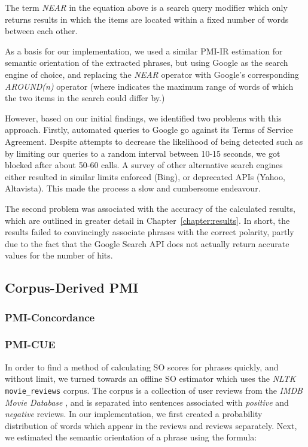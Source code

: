 \documentclass[11pt]{report} %
\begin{document}
The term \textit{NEAR} in the equation above is a search query modifier which only returns results in which the items are located within a fixed number of words between each other. 

As a basis for our implementation, we used a similar PMI-IR estimation for semantic orientation of the extracted phrases, but using Google as the search engine of choice, and replacing the \textit{NEAR} operator with Google's corresponding \textit{AROUND(n)} operator (where  indicates the maximum range of words of which the two items in the search could differ by.)

However, based on our initial findings, we identified two problems with this approach. Firstly, automated queries to Google go against its Terms of Service Agreement. Despite attempts to decrease the likelihood of being detected such as by limiting our queries to a random interval between 10-15 seconds, we got blocked after about 50-60 calls. A survey of other alternative search engines either resulted in similar limits enforced (Bing), or deprecated APIs (Yahoo, Altavista). This made the process a slow and cumbersome endeavour.

The second problem was associated with the accuracy of the calculated results, which are outlined in greater detail in Chapter~\ref{chapter:results}. In short, the results failed to convincingly associate phrases with the correct polarity, partly due to the fact that the Google Search API does not actually return accurate values for the number of hits.

\subsection{Corpus-Derived PMI}

\subsubsection{PMI-Concordance}

\subsubsection{PMI-CUE}
In order to find a method of calculating SO scores for phrases quickly, and without limit, we turned towards an offline SO estimator which uses the \textit{NLTK} \verb|movie_reviews| corpus. The corpus is a collection of user reviews from the \textit{IMDB Movie Database} , and is separated into sentences associated with \textit{positive} and \textit{negative} reviews. In our implementation, we first created a probability distribution of words which appear in the  reviews and  reviews separately. Next, we estimated the semantic orientation of a phrase using the formula:
\end{document}
